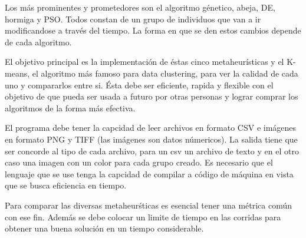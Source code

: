 Los m\'as prominentes y prometedores son el algoritmo g\'enetico, abeja, DE, hormiga
y PSO. Todos constan de un grupo de individuos que van a ir modificandose a trav\'es
del tiempo. La forma en que se den estos cambios depende de cada algoritmo.

\vspace{5 mm}

\label{sect:objetivo_general}
\vspace{5 mm}

El objetivo principal es la implementaci\'on de \'estas cinco metaheur\'isticas
y el K-means, el algoritmo m\'as famoso para data clustering, para ver la calidad
de cada uno y compararlos entre si. \'Esta debe ser eficiente, rapida y flexible
con el objetivo de que pueda ser usada a futuro por otras personas y lograr
comprar los algoritmos de la forma m\'as efectiva.


\vspace{5 mm}

\label{sect:objetivos_especificos}
\vspace{5 mm}

El programa debe tener la capcidad de leer archivos en formato CSV e im\'agenes
en formato PNG y TIFF (las im\'agenes son datos n\'umericos). La salida tiene que ser
concorde al tipo de cada archivo, para un csv un archivo de texto y
en el otro caso una imagen con un color para cada grupo creado. Es necesario que
el lenguaje que se use tenga la capcidad de compilar a c\'odigo de m\'aquina
en vista que se busca eficiencia en tiempo.

Para comparar las diversas metaheur\'sticas es esencial tener una m\'etrica com\'un
con ese fin. Adem\'as se debe colocar un limite de tiempo en las corridas para 
obtener una buena soluci\'on en un tiempo considerable.


